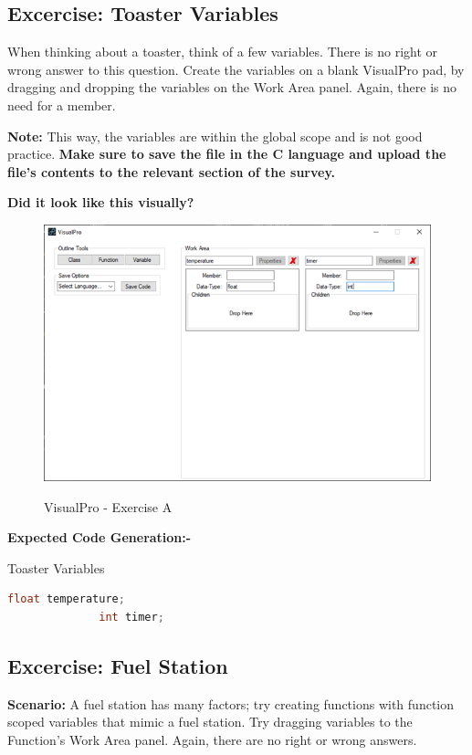 \documentclass[10pt]{article}
\begin{document}
    \subsection{Excercise: Toaster Variables}
        When thinking about a toaster, think of a few variables. There is no right or wrong answer to this question. Create the variables on a blank VisualPro pad, by dragging and dropping the variables on the Work Area panel. Again, there is no need for a member.

        \textbf{Note:} This way, the variables are within the global scope and is not good practice. \textbf{Make sure to save the file in the C language and upload the file's contents to the relevant section of the survey.}

        \textbf{Did it look like this visually?}
          \begin{figure}[h]
            \centering
            {\includegraphics[scale=0.75]{Figures/Exercises/TutB-SecB-1.png}}
            \caption{VisualPro - Exercise A}
            \label{fig:vp-eA}
          \end{figure}

        \textbf{Expected Code Generation:-}
          \begin{example}{Toaster Variables}
            \begin{lstlisting}[language=c]
              float temperature;
              int timer;
            \end{lstlisting}
          \end{example}
    
    \newpage
    \subsection{Excercise: Fuel Station}
        \textbf{Scenario:} A fuel station has many factors; try creating functions with function scoped variables that mimic a fuel station. Try dragging variables to the Function's Work Area panel. Again, there are no right or wrong answers. 
\end{document}
